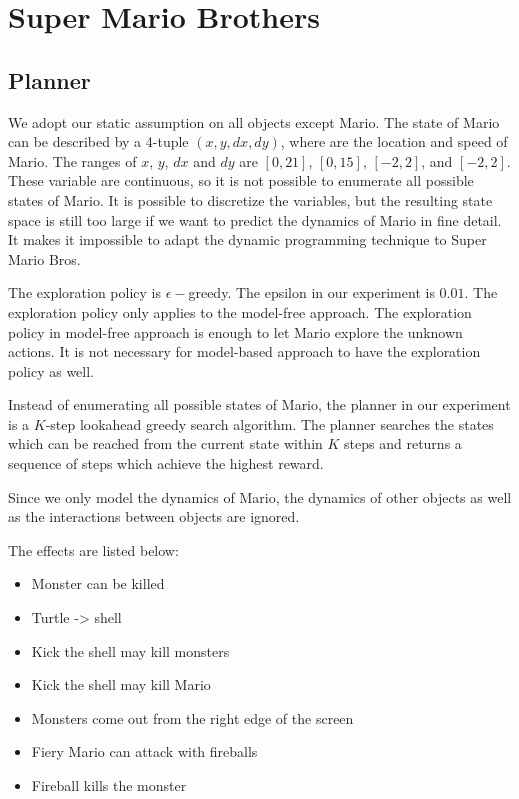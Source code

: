 


\section{Super Mario Brothers}

\subsection{Planner}
We adopt our static assumption on all objects except Mario. The state of Mario 
can be described by a 4-tuple $(x, y, dx, dy)$, where are the location and speed of Mario. 
The ranges of $x$, $y$, $dx$ and $dy$ are $[0, 21]$, $[0, 15]$, $[-2, 2]$, and $[-2, 2]$.
These variable are continuous, so it is not possible to enumerate all possible states
of Mario. It is possible to discretize the variables, but the resulting state space 
is still too large if we want to predict the dynamics of Mario in fine detail.
It makes it impossible to adapt the dynamic programming technique to Super Mario Bros.

The exploration policy is $\epsilon-$greedy. The epsilon in our experiment is $0.01$.
The exploration policy only applies to the model-free approach. 
The exploration policy in model-free approach is enough to let Mario explore the 
unknown actions. It is not necessary for model-based approach to have the exploration policy as well. 

Instead of enumerating all possible states of Mario, the planner in our experiment 
is a $K$-step lookahead greedy search algorithm. The planner searches the states
which can be reached from the current state within $K$ steps and returns a sequence of
steps which achieve the highest reward.

Since we only model the dynamics of Mario, the dynamics of other objects as well as 
the interactions between objects are ignored. 

The effects are listed below:
\begin{itemize}
\item Monster can be killed
\item Turtle -> shell
\item Kick the shell may kill monsters
\item Kick the shell may kill Mario
\item Monsters come out from the right edge of the screen
\item Fiery Mario can attack with fireballs
\item Fireball kills the monster
\end{itemize}

